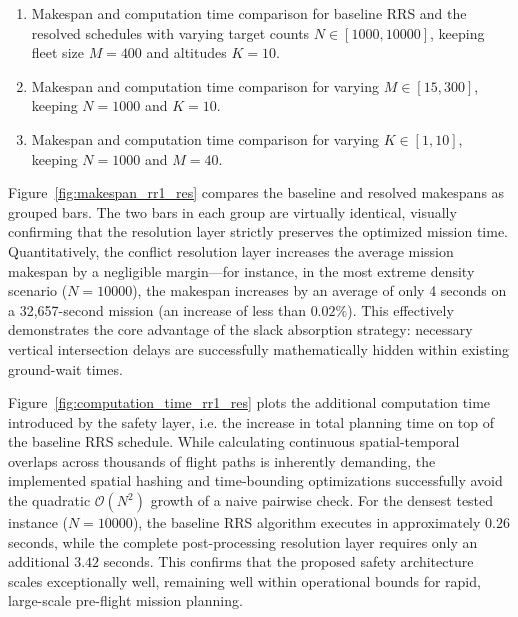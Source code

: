 \documentclass[subscriptcorrection,upint,nolists, varvw,barcolor=Goldenrod3,mathalfa=cal=euler,balance,hyphenate,french]{asmejour} %
\begin{document}
\begin{enumerate}
    \item Makespan and computation time comparison for baseline RRS and the resolved schedules with varying target counts \(N \in [1000, 10000]\), keeping fleet size \(M=400\) and altitudes \(K=10\).
    \item Makespan and computation time comparison for varying \(M \in [15, 300]\), keeping \(N=1000\) and \(K=10\).
    \item Makespan and computation time comparison for varying \(K \in [1, 10]\), keeping \(N=1000\) and \(M=40\).
\end{enumerate}


Figure~\ref{fig:makespan_rr1_res} compares the baseline and resolved makespans as grouped bars.
The two bars in each group are virtually identical, visually confirming that the resolution layer strictly preserves the optimized mission time.
Quantitatively, the conflict resolution layer increases the average mission makespan by a negligible margin---for instance, in the most extreme density scenario (\(N=10000\)), the makespan increases by an average of only 4 seconds on a 32,657-second mission (an increase of less than $0.02\%$). 
This effectively demonstrates the core advantage of the slack absorption strategy: necessary vertical intersection delays are successfully mathematically hidden within existing ground-wait times.

Figure~\ref{fig:computation_time_rr1_res} plots the additional computation time introduced by the safety layer, i.e. the increase in total planning time on top of the baseline RRS schedule.
While calculating continuous spatial-temporal overlaps across thousands of flight paths is inherently demanding, the implemented spatial hashing and time-bounding optimizations successfully avoid the quadratic $\mathcal{O}(N^2)$ growth of a naive pairwise check.
For the densest tested instance (\(N=10000\)), the baseline RRS algorithm executes in approximately $0.26$ seconds, while the complete post-processing resolution layer requires only an additional $3.42$ seconds. 
This confirms that the proposed safety architecture scales exceptionally well, remaining well within operational bounds for rapid, large-scale pre-flight mission planning.

\end{document}
